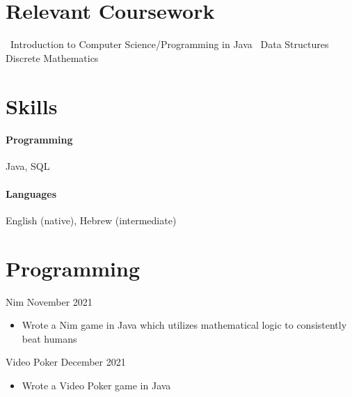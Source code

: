 \documentclass[10pt]{article}
\begin{document}
\vfill                                                            
\section*{Relevant Coursework}
    \textbullet \, Introduction to Computer Science/Programming in Java
    \hfill
    \textbullet \, Data Structures
    \hfill
    \textbullet \, Discrete Mathematics


\vfill
\section*{Skills}

    \paragraph*{Programming}
    Java, SQL
    \paragraph*{Languages}
    English (native), Hebrew (intermediate)


    \vfill
\section*{Programming}

    Nim \hfill November 2021
    \begin{itemize}
        \item Wrote a Nim game in Java which utilizes mathematical logic to consistently beat humans
    \end{itemize}

    Video Poker \hfill December 2021
    \begin{itemize}
        \item Wrote a Video Poker game in Java
    \end{itemize}
\end{document}
